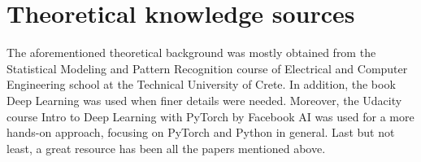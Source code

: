\section{Theoretical knowledge sources}
The aforementioned theoretical background was mostly obtained from the Statistical Modeling and Pattern Recognition course of Electrical and Computer Engineering school at the Technical University of Crete. In addition, the book Deep Learning \cite{Goodfellow-et-al-2016} was used when finer details were needed. Moreover, the Udacity course Intro to Deep Learning with PyTorch by Facebook AI \cite{Udacity-Intro-to-Deep-Learning-with-PyTorch-by-Facebook-AI} was used for a more hands-on approach, focusing on PyTorch and Python in general. Last but not least, a great resource has been all the papers mentioned above.

